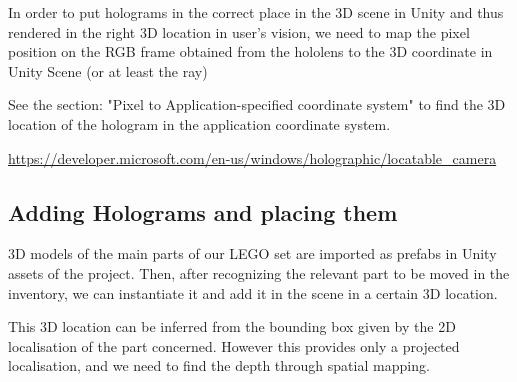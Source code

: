 \documentclass[a4paper,10pt]{article}
\begin{document}
In order to put holograms in the correct place in the 3D scene in Unity and thus rendered in the right 3D location in user's vision, we need to map the pixel position on the RGB frame obtained from the hololens to the 3D coordinate in Unity Scene (or at least the ray)

See the section: "Pixel to Application-specified coordinate system" to find the 3D location of the hologram in the application coordinate system.

\url{https://developer.microsoft.com/en-us/windows/holographic/locatable_camera}

\subsection{Adding Holograms and placing them}
3D models of the main parts of our LEGO set are imported as prefabs in Unity assets of the project. Then, after recognizing the relevant part to be moved in the inventory, we can instantiate it and add it in the scene in a certain 3D location.

This 3D location can be inferred from the bounding box given by the 2D localisation of the part concerned. However this provides only a projected localisation, and we need to find the depth through spatial mapping.



\end{document}
